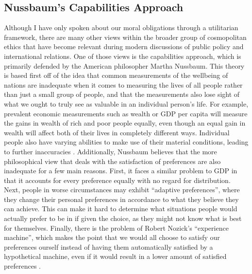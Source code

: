 \documentclass[12pt]{article}
\begin{document}
\subsection*{Nussbaum's Capabilities Approach}
Although I have only spoken about our moral obligations through a utilitarian framework, there are many other views within the broader group of cosmopolitan ethics that have become relevant during modern discussions of public policy and international relations.
One of those views is the capabilities approach, which is primarily defended by the American philosopher Martha Nussbaum.
This theory is based first off of the idea that common measurements of the wellbeing of nations are inadequate when it comes to measuring the lives of all people rather than just a small group of people, and that the measurements also lose sight of what we ought to truly see as valuable in an individual person's life.
For example, prevalent economic measurements such as wealth or GDP per capita will measure the gains in wealth of rich and poor people equally, even though an equal gain in wealth will affect both of their lives in completely different ways.
Individual people also have varying abilities to make use of their material conditions, leading to further inaccuracies \autocite[238]{nussbaum2019}.
Additionally, Nussbaum believes that the more philosophical view that deals with the satisfaction of preferences are also inadequate for a few main reasons.
First, it faces a similar problem to GDP in that it accounts for every preference equally with no regard for distribution.
Next, people in worse circumstances may exhibit ``adaptive preferences'', where they change their personal preferences in accordance to what they believe they can achieve.
This can make it hard to determine what situations people would actually prefer to be in if given the choice, as they might not know what is best for themselves.
Finally, there is the problem of Robert Nozick's ``experience machine'', which makes the point that we would all choose to satisfy our preferences ourself instead of having them automatically satisfied by a hypothetical machine, even if it would result in a lower amount of satisfied preferences \autocite[239]{nussbaum2019}.
\end{document}
